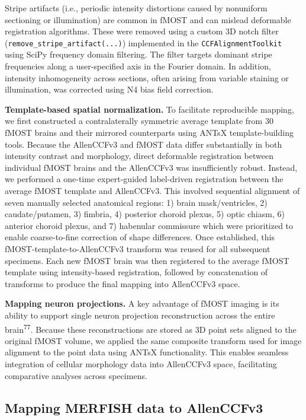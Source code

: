 \documentclass[
  12pt,
]{article}
\begin{document}
Stripe artifacts (i.e., periodic intensity distortions caused by
nonuniform sectioning or illumination) are common in fMOST and can
mislead deformable registration algorithms. These were removed using a
custom 3D notch filter (\texttt{remove\_stripe\_artifact(...)})
implemented in the \texttt{CCFAlignmentToolkit} using SciPy frequency
domain filtering. The filter targets dominant stripe frequencies along a
user-specified axis in the Fourier domain. In addition, intensity
inhomogeneity across sections, often arising from variable staining or
illumination, was corrected using N4 bias field correction.

\textbf{Template-based spatial normalization.} To facilitate
reproducible mapping, we first constructed a contralaterally symmetric
average template from 30 fMOST brains and their mirrored counterparts
using ANTsX template-building tools. Because the AllenCCFv3 and fMOST
data differ substantially in both intensity contrast and morphology,
direct deformable registration between individual fMOST brains and the
AllenCCFv3 was insufficiently robust. Instead, we performed a one-time
expert-guided label-driven registration between the average fMOST
template and AllenCCFv3. This involved sequential alignment of seven
manually selected anatomical regions: 1) brain mask/ventricles, 2)
caudate/putamen, 3) fimbria, 4) posterior choroid plexus, 5) optic
chiasm, 6) anterior choroid plexus, and 7) habenular commissure which
were prioritized to enable coarse-to-fine correction of shape
differences. Once established, this fMOST-template-to-AllenCCFv3
transform was reused for all subsequent specimens. Each new fMOST brain
was then registered to the average fMOST template using intensity-based
registration, followed by concatenation of transforms to produce the
final mapping into AllenCCFv3 space.

\textbf{Mapping neuron projections.} A key advantage of fMOST imaging is
its ability to support single neuron projection reconstruction across
the entire brain\textsuperscript{77}. Because these reconstructions are
stored as 3D point sets aligned to the original fMOST volume, we applied
the same composite transform used for image alignment to the point data
using ANTsX functionality. This enables seamless integration of cellular
morphology data into AllenCCFv3 space, facilitating comparative analyses
across specimens.

\subsection{Mapping MERFISH data to
AllenCCFv3}\label{mapping-merfish-data-to-allenccfv3}
\end{document}
